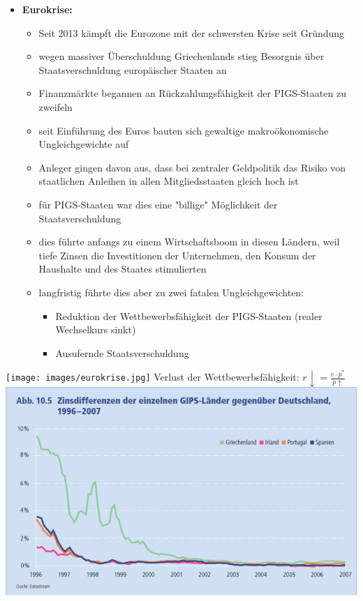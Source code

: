 \begin{multicols}{2}
	\begin{itemize}
		\item \textbf{Eurokrise:}
		\begin{itemize}
			\item Seit 2013 kämpft die Eurozone mit der schwersten Krise seit Gründung
			\item wegen massiver Überschuldung Griechenlands stieg Besorgnis über Staatsverschuldung europäischer Staaten an
			\item Finanzmärkte begannen an Rückzahlungsfähigkeit der PIGS-Staaten zu zweifeln
			\item seit Einführung des Euros bauten sich gewaltige makroökonomische Ungleichgewichte auf
			\item Anleger gingen davon aus, dass bei zentraler Geldpolitik das Risiko von staatlichen Anleihen in allen Mitgliedsstaaten gleich hoch ist
			\item für PIGS-Staaten war dies eine "billige" Möglichkeit der Staatsverschuldung
			\item dies führte anfangs zu einem Wirtschaftsboom in diesen Ländern, weil tiefe Zinsen die Investitionen der Unternehmen, den Konsum der Haushalte und des Staates stimulierten
			\item langfristig führte dies aber zu zwei fatalen Ungleichgewichten:
			\begin{itemize}
				\item Reduktion der Wettbewerbsfähigkeit der PIGS-Staaten (realer Wechselkurs sinkt)
				\item Ausufernde Staatsverschuldung
			\end{itemize}
		\end{itemize}
	\end{itemize}
	\vfill\null
	\columnbreak
	\texttt{[image: images/eurokrise.jpg]}
	\vspace{\baselineskip}
	Verlust der Wettbewerbsfähigkeit:
	$r\downarrow = \frac{e \cdot p^*}{p\uparrow}$
	\includegraphics[width=\linewidth]{images/pigs.png}
	\vfill\null
\end{multicols}
\clearpage
\pagebreak